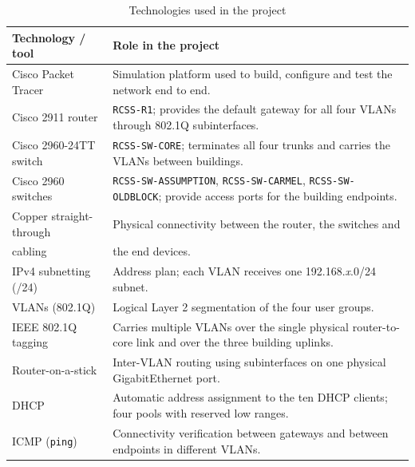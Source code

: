\documentclass[11pt,a4paper]{article}
\begin{document}
\begin{table}[H]
\centering
\small
\caption{Technologies used in the project}
\begin{tabular}{@{}L{0.28\textwidth} L{0.66\textwidth}@{}}
\toprule
\textbf{Technology / tool} & \textbf{Role in the project} \\
\midrule
Cisco Packet Tracer       & Simulation platform used to build, configure and test the
                            network end to end. \\
Cisco 2911 router         & \texttt{RCSS-R1}; provides the default gateway for all four
                            VLANs through 802.1Q subinterfaces. \\
Cisco 2960-24TT switch    & \texttt{RCSS-SW-CORE}; terminates all four trunks and carries
                            the VLANs between buildings. \\
Cisco 2960 switches       & \texttt{RCSS-SW-ASSUMPTION}, \texttt{RCSS-SW-CARMEL},
                            \texttt{RCSS-SW-OLDBLOCK}; provide access ports for the
                            building endpoints. \\
Copper straight-through   & Physical connectivity between the router, the switches and \\
cabling                    & the end devices. \\
IPv4 subnetting (/24)     & Address plan; each VLAN receives one 192.168.\textit{x}.0/24
                            subnet. \\
VLANs (802.1Q)            & Logical Layer 2 segmentation of the four user groups. \\
IEEE 802.1Q tagging       & Carries multiple VLANs over the single physical router-to-core
                            link and over the three building uplinks. \\
Router-on-a-stick         & Inter-VLAN routing using subinterfaces on one physical
                            GigabitEthernet port. \\
DHCP                      & Automatic address assignment to the ten DHCP clients; four
                            pools with reserved low ranges. \\
ICMP (\texttt{ping})       & Connectivity verification between gateways and between
                            endpoints in different VLANs. \\
\bottomrule
\end{tabular}
\end{table}

\end{document}
